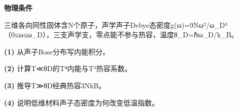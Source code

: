 \textbf{物理条件}\par 三维各向同性固体含N个原子，声学声子Debye态密度g(ω)=9Nω²/ω\_D³（0≤ω≤ω\_D），三支声学支，零点能不参与热容，温度θ\_D=ℏω\_D/k\_B。
\par\noindent\textbf{(1)} 从声子Bose分布写内能积分。
\par\noindent\textbf{(2)} 计算T≪θD的T⁴内能与T³热容系数。
\par\noindent\textbf{(3)} 推导T≫θD经典热容3NkB。
\par\noindent\textbf{(4)} 说明低维材料声子态密度为何改变低温指数。
